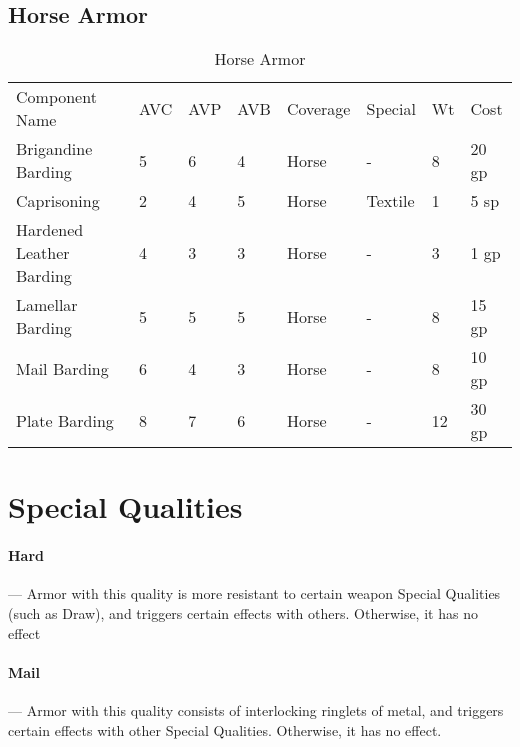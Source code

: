\documentclass[oneside,11pt,english]{book}
\begin{document}
\subsection{Horse Armor}
\begin{longtabu} to 
	\caption{Horse Armor}
	\label{tab:Horse Armor}\\
Component Name&AVC&AVP&AVB& Coverage& Special& Wt&Cost\\
Brigandine 
Barding& 5& 6& 4& Horse& -& 8& 20 gp\\
Caprisoning& 2& 4& 5& Horse& Textile& 1& 5 sp\\
Hardened Leather 
Barding& 4& 3& 3& Horse& -& 3& 1 gp\\
Lamellar Barding& 5& 5& 5& Horse& -& 8& 15 gp\\
Mail Barding& 6& 4& 3& Horse& -& 8& 10 gp\\
Plate Barding& 8& 7& 6& Horse& -& 12& 30 gp\\
\end{longtabu}

\section{Special Qualities}
\paragraph{\label{par:Hard}Hard}---\quad
	Armor with this quality is more resistant to certain weapon Special Qualities (such as Draw), and triggers certain effects with others. Otherwise, it has no effect
\vspace*{-10pt}\paragraph{\label{par:Mail}Mail}---\quad
	Armor with this quality consists of interlocking ringlets of metal, and triggers certain effects with other Special Qualities. Otherwise, it has no effect.
\end{document}
